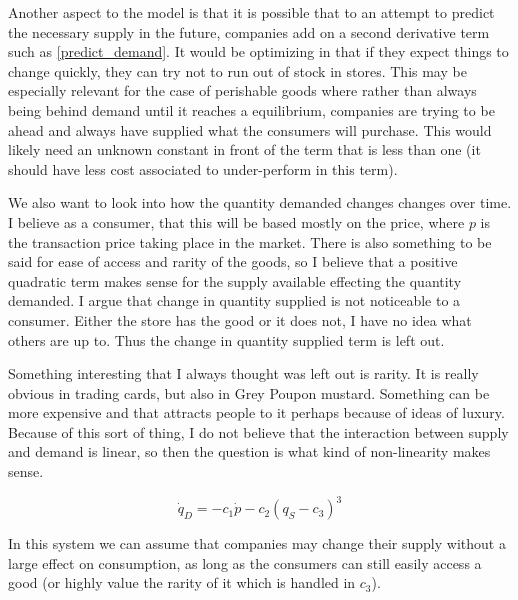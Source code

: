 \documentclass{article}
\begin{document}
Another aspect to the model is that it is possible that to an attempt to predict the necessary supply in the future, companies add on a second derivative term such as \eqref{predict_demand}.
It would be optimizing in that if they expect things to change quickly, they can try not to run out of stock in stores. This may be especially relevant for the case of perishable goods where rather than always being behind demand until it reaches a equilibrium, companies are trying to be ahead and always have supplied what the consumers will purchase. This would likely need an unknown constant in front of the term that is less than one (it should have less cost associated to under-perform in this term). 

We also want to look into how the quantity demanded changes changes over time. I believe as a consumer, that this will be based mostly on the price, where $p$ is the transaction price taking place in the market. There is also something to be said for ease of access and rarity of the goods, so I believe that a positive quadratic term makes sense for the supply available effecting the quantity demanded. I argue that change in quantity supplied is not noticeable to a consumer. Either the store has the good or it does not, I have no idea what others are up to. Thus the change in quantity supplied term is left out. 

Something interesting that I always thought was left out is rarity. It is really obvious in trading cards, but also in Grey Poupon mustard. Something can be more expensive and that attracts people to it perhaps because of ideas of luxury. Because of this sort of thing, I do not believe that the interaction between supply and demand is linear, so then the question is what kind of non-linearity makes sense. 

\begin{equation}
		\dot{q}_D = - c_1 \dot{p} - c_2(q_S-c_3)^3
\end{equation}

In this system we can assume that companies may change their supply without a large effect on consumption, as long as the consumers can still easily access a good (or highly value the rarity of it which is handled in $c_3$).
\end{document}

